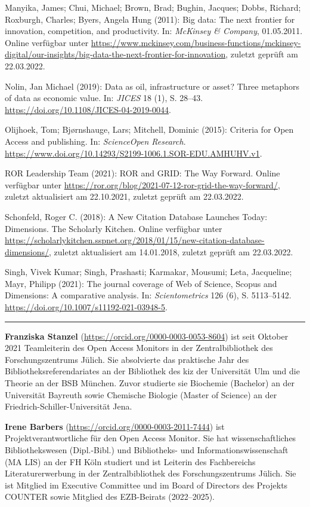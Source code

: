 \documentclass[a4paper,
fontsize=11pt,
oneside,
numbers=noperiodatend,
parskip=half-,
bibliography=totoc,
final
]{scrartcl}
\begin{document}
Manyika, James; Chui, Michael; Brown, Brad; Bughin, Jacques; Dobbs,
Richard; Roxburgh, Charles; Byers, Angela Hung (2011): Big data: The
next frontier for innovation, competition, and productivity. In:
\emph{McKinsey \& Company}, 01.05.2011. Online verfügbar unter
\url{https://www.mckinsey.com/business-functions/mckinsey-digital/our-insights/big-data-the-next-frontier-for-innovation},
zuletzt geprüft am 22.03.2022.

Nolin, Jan Michael (2019): Data as oil, infrastructure or asset? Three
metaphors of data as economic value. In: \emph{JICES} 18 (1), S. 28--43.
\url{https://doi.org/10.1108/JICES-04-2019-0044}.

Olijhoek, Tom; Bjørnshauge, Lars; Mitchell, Dominic (2015): Criteria for
Open Access and publishing. In: \emph{ScienceOpen Research}.
\url{https://www.doi.org/10.14293/S2199-1006.1.SOR-EDU.AMHUHV.v1}.

ROR Leadership Team (2021): ROR and GRID: The Way Forward. Online
verfügbar unter
\url{https://ror.org/blog/2021-07-12-ror-grid-the-way-forward/}, zuletzt
aktualisiert am 22.10.2021, zuletzt geprüft am 22.03.2022.

Schonfeld, Roger C. (2018): A New Citation Database Launches Today:
Dimensions. The Scholarly Kitchen. Online verfügbar unter
\url{https://scholarlykitchen.sspnet.org/2018/01/15/new-citation-database-dimensions/},
zuletzt aktualisiert am 14.01.2018, zuletzt geprüft am 22.03.2022.

Singh, Vivek Kumar; Singh, Prashasti; Karmakar, Mousumi; Leta,
Jacqueline; Mayr, Philipp (2021): The journal coverage of Web of
Science, Scopus and Dimensions: A comparative analysis. In:
\emph{Scientometrics} 126 (6), S. 5113--5142.
\url{https://doi.org/10.1007/s11192-021-03948-5}.

\begin{center}\rule{0.5\linewidth}{0.5pt}\end{center}

\textbf{Franziska Stanzel} (\url{https://orcid.org/0000-0003-0053-8604}) ist seit Oktober 2021 Teamleiterin des Open
Access Monitors in der Zentralbibliothek des Forschungszentrums Jülich.
Sie absolvierte das praktische Jahr des Bibliotheksreferendariates an
der Bibliothek des kiz der Universität Ulm und die Theorie an der BSB
München. Zuvor studierte sie Biochemie (Bachelor) an der Universität
Bayreuth sowie Chemische Biologie (Master of Science) an der
Friedrich-Schiller-Universität Jena.

\textbf{Irene Barbers} (\url{https://orcid.org/0000-0003-2011-7444}) ist Projektverantwortliche für den Open Access
Monitor. Sie hat wissenschaftliches Bibliothekswesen (Dipl.-Bibl.) und
Bibliotheks- und Informationswissenschaft (MA LIS) an der FH Köln
studiert und ist Leiterin des Fachbereichs Literaturerwerbung in der
Zentralbibliothek des Forschungszentrums Jülich. Sie ist Mitglied im
Executive Committee und im Board of Directors des Projekts COUNTER sowie
Mitglied des EZB-Beirats (2022--2025).
\end{document}
